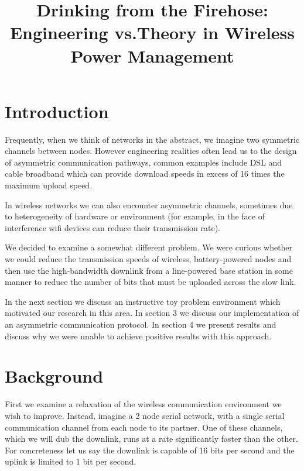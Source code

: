 \documentclass[conference]{IEEEtran}
\begin{document}
\title{Drinking from the Firehose: Engineering vs.Theory in Wireless
  Power Management}

\author{
}
\maketitle

\section{Introduction}

Frequently, when we think of networks in the abstract, we imagine two
symmetric channels between nodes.  However engineering realities often
lead us to the design of asymmetric communication pathways, common
examples include DSL and cable broadband which can provide download
speeds in excess of 16 times the maximum upload speed.

In wireless networks we can also encounter asymmetric channels,
sometimes due to heterogeneity of hardware or environment (for
example, in the face of interference wifi devices can reduce their
transmission rate).

We decided to examine a somewhat different problem.  We were curious
whether we could reduce the transmission speeds of wireless,
battery-powered nodes and then use the high-bandwidth downlink from
a line-powered base station in some manner to reduce the number of
bits that must be uploaded across the slow link.

In the next section we discuss an instructive toy problem environment
which motivated our research in this area.  In section 3 we discuss
our implementation of an asymmetric communication protocol.  In
section 4 we present results and discuss why we were unable to
achieve positive results with this approach.

\section{Background}

First we examine a relaxation of the wireless communication
environment we wish to improve.  Instead, imagine a 2 node serial
network, with a single serial communication channel from each node to
its partner.  One of these channels, which we will dub the downlink,
runs at a rate significantly faster than the other.  For concreteness
let us say the downlink is capable of 16 bits per second and the
uplink is limited to 1 bit per second.
\end{document}
